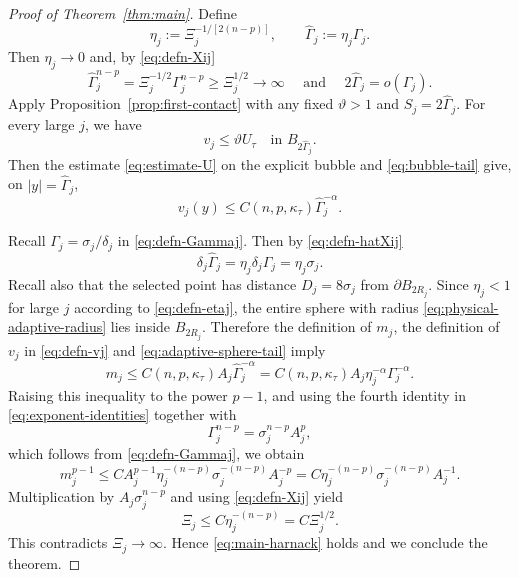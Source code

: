 \documentclass[reqno,12pt]{amsart}
\numberwithin{equation}{section}
\theoremstyle{remark}
\begin{document}
\begin{proof}[Proof of Theorem~\ref{thm:main}]
Define
\begin{equation}\label{eq:defn-etaj}
\eta_j:=\Xi_j^{-1/[2(n-p)]}, \qquad \widehat\Gamma_j:=\eta_j\Gamma_j.
\end{equation}
Then $\eta_j\to0$ and, by \eqref{eq:defn-Xij}
\begin{equation}\label{eq:defn-hatXij}
\widehat\Gamma_j^{n-p} =\Xi_j^{-1/2}\Gamma_j^{n-p}
\ge\Xi_j^{1/2}\to \infty \quad \text{ and }
\quad 2\widehat\Gamma_j=o(\Gamma_j).
\end{equation}
Apply Proposition~\ref{prop:first-contact} with any fixed
$\vartheta>1$ and $S_j=2\widehat\Gamma_j$.  For every large $j$, we have
\begin{equation*}
v_j\le\vartheta U_\tau
\quad\text{in }B_{2\widehat\Gamma_j}.
\end{equation*}
Then the estimate \eqref{eq:estimate-U} on the explicit bubble and \eqref{eq:bubble-tail} give, on
$|y|=\widehat\Gamma_j$,
\begin{equation}\label{eq:adaptive-sphere-tail}
v_j(y)\le C(n,p,\kappa_\tau)\widehat\Gamma_j^{-\alpha}.
\end{equation}

Recall   $\Gamma_j=\sigma_j/\delta_j$ in \eqref{eq:defn-Gammaj}. Then by \eqref{eq:defn-hatXij}
\begin{equation}\label{eq:physical-adaptive-radius}
\delta_j\widehat\Gamma_j =\eta_j\delta_j\Gamma_j =\eta_j\sigma_j.
\end{equation}
Recall also that the selected point has distance
$D_j=8\sigma_j$ from $\partial B_{2R_j}$.  Since $\eta_j<1$ for large $j$ according to \eqref{eq:defn-etaj}, the entire sphere with radius
\eqref{eq:physical-adaptive-radius} lies inside $B_{2R_j}$.  Therefore the definition of $m_j$, the definition of $v_j$ in \eqref{eq:defn-vj} and \eqref{eq:adaptive-sphere-tail} imply
\begin{equation*}
m_j\le C(n,p,\kappa_\tau) A_j\widehat\Gamma_j^{-\alpha}
= C(n,p,\kappa_\tau)  A_j\eta_j^{-\alpha}\Gamma_j^{-\alpha}.
\end{equation*}
Raising this inequality to the power $p-1$, and using the fourth identity in \eqref{eq:exponent-identities} together with
\begin{equation*}
\Gamma_j^{n-p}=\sigma_j^{n-p}A_j^p,
\end{equation*}
which follows from \eqref{eq:defn-Gammaj}, we obtain
$$
m_j^{p-1} \le C A_j^{p-1}\eta_j^{-(n-p)} \sigma_j^{-(n-p)}A_j^{-p}
=C\eta_j^{-(n-p)}\sigma_j^{-(n-p)}A_j^{-1}.
$$
Multiplication by $A_j\sigma_j^{n-p}$ and using \eqref{eq:defn-Xij} yield
\begin{equation*}
\Xi_j\le C\eta_j^{-(n-p)}=C\Xi_j^{1/2}.
\end{equation*}
This contradicts $\Xi_j\to\infty$.  Hence
\eqref{eq:main-harnack} holds and we conclude the theorem.
\end{proof}
\end{document}
